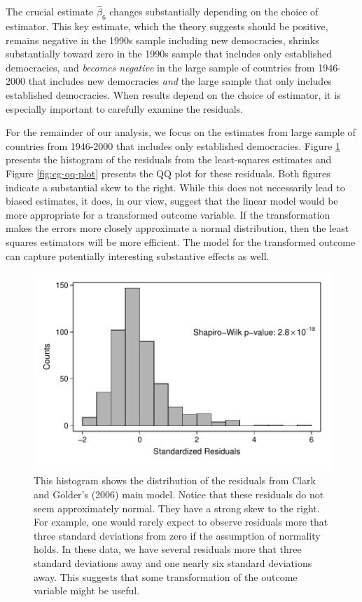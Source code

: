 \documentclass[12pt]{article}
\begin{document}
The crucial estimate $\hat{\beta}_6$ changes substantially depending on the choice of estimator. 
This key estimate, which the theory suggests should be positive, remains negative in the 1990s sample including new democracies, shrinks substantially toward zero in the 1990s sample that includes only established democracies, and \textit{becomes negative} in the large sample of countries from 1946-2000 that includes new democracies \textit{and} the large sample that only includes established democracies. 
When results depend on the choice of estimator, it is especially important to carefully examine the residuals.

For the remainder of our analysis, we focus on the estimates from large sample of countries from 1946-2000 that includes only established democracies. 
Figure \ref{fig:cg-residuals-hist} presents the histogram of the residuals from the least-squares estimates and Figure \ref{fig:cg-qq-plot} presents the QQ plot for these residuals. 
Both figures indicate a substantial skew to the right. 
While this does not necessarily lead to biased estimates, it does, in our view, suggest that the linear model would be more appropriate for a transformed outcome variable. 
If the transformation makes the errors more closely approximate a normal distribution, then the least squares estimators will be more efficient. 
The model for the transformed outcome can capture potentially interesting substantive effects as well.

\begin{figure}[h!]
\begin{center}
\includegraphics[scale = 0.6]{figs/cg-residuals-hist.pdf}
\caption{This histogram shows the distribution of the residuals from Clark and Golder's (2006) main model. 
Notice that these residuals do not seem approximately normal. They have a strong skew to the right. 
For example, one would rarely expect to observe residuals more that three standard deviations from zero if the assumption of normality holds. 
In these data, we have several residuals more that three standard deviations away and one nearly six standard deviations away. 
This suggests that some transformation of the outcome variable might be useful.}\label{fig:cg-residuals-hist}	
\end{center}
\end{figure}
\end{document}
